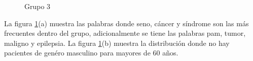 \begin{figure}[h!]
	\centering
	\caption{Grupo 3} \label{fig:c3}
\end{figure}

La figura \ref{fig:c3}(a)  muestra las palabras donde seno, cáncer y síndrome son las más frecuentes dentro del grupo, adicionalmente se tiene las palabras pam, tumor, maligno y epilepsia. La figura \ref{fig:c3}(b) muestra la distribución donde no hay pacientes de genéro masculino para mayores de 60 años.  

